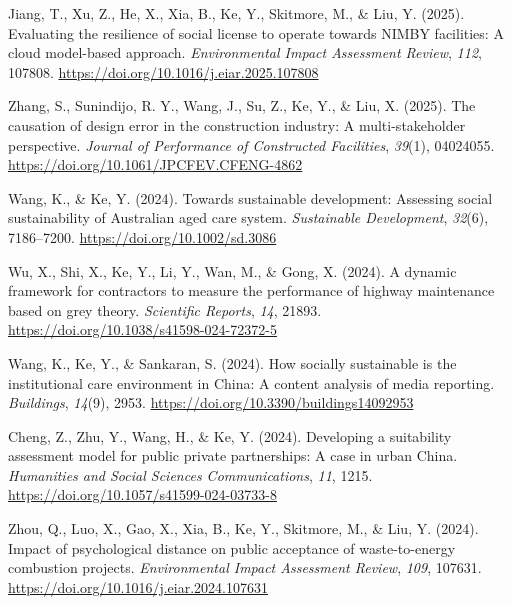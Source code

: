 \documentclass[11pt,a4paper]{report} %
\begin{document}
\begin{tablist}
        \item[2025] \tab{}Jiang, T., Xu, Z., He, X., Xia, B., Ke, Y., Skitmore, M., \& Liu, Y. (2025). Evaluating the resilience of social license to operate towards NIMBY facilities: A cloud model-based approach. \textit{Environmental Impact Assessment Review}, \textit{112}, 107808. \href{https://doi.org/10.1016/j.eiar.2025.107808}{https://doi.org/10.1016/j.eiar.2025.107808}
        
        \item[2025] \tab{}Zhang, S., Sunindijo, R. Y., Wang, J., Su, Z., Ke, Y., \& Liu, X. (2025). The causation of design error in the construction industry: A multi-stakeholder perspective. \textit{Journal of Performance of Constructed Facilities}, \textit{39}(1), 04024055. \href{https://doi.org/10.1061/JPCFEV.CFENG-4862}{https://doi.org/10.1061/JPCFEV.CFENG-4862}
        
        \item[2024] \tab{}Wang, K., \& Ke, Y. (2024). Towards sustainable development: Assessing social sustainability of Australian aged care system. \textit{Sustainable Development}, \textit{32}(6), 7186--7200. \href{https://doi.org/10.1002/sd.3086}{https://doi.org/10.1002/sd.3086}
        
        \item[2024] \tab{}Wu, X., Shi, X., Ke, Y., Li, Y., Wan, M., \& Gong, X. (2024). A dynamic framework for contractors to measure the performance of highway maintenance based on grey theory. \textit{Scientific Reports}, \textit{14}, 21893. \href{https://doi.org/10.1038/s41598-024-72372-5}{https://doi.org/10.1038/s41598-024-72372-5}
        
        \item[2024] \tab{}Wang, K., Ke, Y., \& Sankaran, S. (2024). How socially sustainable is the institutional care environment in China: A content analysis of media reporting. \textit{Buildings}, \textit{14}(9), 2953. \href{https://doi.org/10.3390/buildings14092953}{https://doi.org/10.3390/buildings14092953}
        
        \item[2024] \tab{}Cheng, Z., Zhu, Y., Wang, H., \& Ke, Y. (2024). Developing a suitability assessment model for public private partnerships: A case in urban China. \textit{Humanities and Social Sciences Communications}, \textit{11}, 1215. \href{https://doi.org/10.1057/s41599-024-03733-8}{https://doi.org/10.1057/s41599-024-03733-8}
        
        \item[2024] \tab{}Zhou, Q., Luo, X., Gao, X., Xia, B., Ke, Y., Skitmore, M., \& Liu, Y. (2024). Impact of psychological distance on public acceptance of waste-to-energy combustion projects. \textit{Environmental Impact Assessment Review}, \textit{109}, 107631. \href{https://doi.org/10.1016/j.eiar.2024.107631}{https://doi.org/10.1016/j.eiar.2024.107631}
        

\end{tablist}
\end{document}
